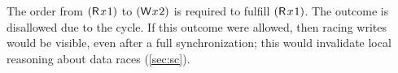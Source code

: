 The order from $(\DR{x}{1})$ to $(\DW{x}{2})$ is required to fulfill
$(\DR{x}{1})$. The outcome is disallowed due to the cycle. %
If this outcome were allowed, then racing writes would be visible, even after
a full synchronization; this would invalidate local reasoning about data
races (\textsection\ref{sec:sc}).



